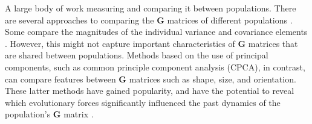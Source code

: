 \documentclass[9pt,twocolumn,twoside]{gsajnl}
\newcommand{\G}{\textbf{G }}
\begin{document}
A large body of work measuring and comparing it between populations. There are several approaches to comparing the \G matrices of different populations \citep{Steppan2002}. Some compare the magnitudes of the individual variance and covariance elements \citep{atchley1992evolutionary,lofsvold1986quantitative}. However, this might not capture important characteristics of \G matrices that are shared between populations. Methods based on the use of principal components, such as common principle component analysis (CPCA), in contrast, can compare features between \G matrices such as shape, size, and orientation. These latter methods have gained popularity, and have the potential to reveal which evolutionary forces significantly influenced the past dynamics of the population's \G matrix \cite{Phillips1999,Arnold2008}. 
% 
% 
% 



\end{document}
